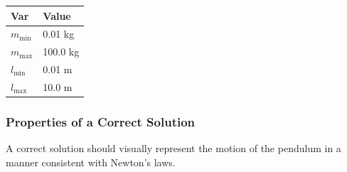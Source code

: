 \documentclass[12pt]{article}
\begin{document}


\begin{table}[!h]
\caption{Specification Parameter Values} \label{TblSpecParams}
\renewcommand{\arraystretch}{1.2}
\noindent \begin{longtable*}{l l} 
  \toprule
  \textbf{Var} & \textbf{Value} \\
  \midrule 
  $m_{\text{min}}$ & 0.01 \si{\kilogram}\\
  $m_{\text{max}}$ & 100.0 \si{\kilogram}\\
  $l_{\text{min}}$ & 0.01 \si{\metre}\\
  $l_{\text{max}}$ & 10.0 \si{\metre}\\
  \bottomrule
\end{longtable*}
\end{table}

\subsubsection{Properties of a Correct Solution} \label{sec_CorrectSolution}

\noindent
A correct solution should visually represent the motion 
of the pendulum in a manner consistent with Newton's laws.

\end{document}
